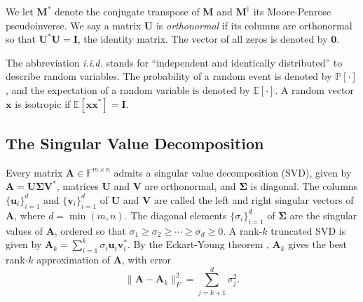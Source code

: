 \documentclass[11pt]{article}
\newcommand{\kpnote}[1]{\textit{\textcolor{violet}{KP: #1}}}
\newcommand{\llnote}[1]{\textit{\textcolor{olive}{LL: #1}}}
\newcommand{\F}{\mathbb{F}}
\begin{document}
We let $\mathbf{M}^*$ denote the conjugate transpose of $\mathbf{M}$ and $\mathbf{M}^\dagger$ its Moore-Penrose pseudoinverse.
We say a matrix $\mathbf{U}$ is \textit{orthonormal} if its columns are orthonormal so that $\mathbf{U}^* \mathbf{U} = \mathbf{I}$, the identity matrix.
The vector of all zeros is denoted by $\mathbf{0}$.

The abbreviation \textit{i.i.d.} stands for ``independent and identically distributed'' to describe random variables.
The probability of a random event is denoted by $\mathbb{P}[\cdot]$, and the expectation of a random variable is denoted by $\mathbb{E}[\cdot]$.
A random vector $\mathbf{x}$ is isotropic if $\mathbb{E}[\mathbf{x} \mathbf{x}^*
    ] = {\mathbf{I}}$.

\vspace{2mm}

\subsection{The Singular Value Decomposition}
\label{sec:svd}

Every matrix $\mathbf{A} \in \F^{m \times n}$ admits a {singular value decomposition} (SVD), given by $\mathbf{A} = \mathbf{U} \boldsymbol{\Sigma} \mathbf{V}^*$, matrices $\mathbf{U}$ and $\mathbf{V}$ are orthonormal, and $\boldsymbol{\Sigma}$ is diagonal.
The columns $\{ \mathbf{u}_i \}_{i=1}^{d}$ and $\{\mathbf{v}_{i}\}_{i=1}^{d}$ of $\mathbf{U}$ and $\mathbf{V}$ are called the left and right singular vectors of $\mathbf{A}$, where $d = \min(m,n)$.
The diagonal elements $\{ \sigma_i\}_{i=1}^{d}$ of $\boldsymbol{\Sigma}$ are the singular values of $\mathbf{A}$, ordered so that $\sigma_1 \geq \sigma_2 \geq \cdots \geq \sigma_d \geq 0$.
A rank-$k$ truncated SVD is given by $\mathbf{A}_k = \sum_{i=1}^k \sigma_i \mathbf{u}_i \mathbf{v}_i^*$.
By the Eckart-Young theorem \cite{eckart1936}, $\mathbf{A}_k$ gives the best rank-$k$ approximation of $\mathbf{A}$, with error
$$\| \mathbf{A} - \mathbf{A}_k\|_F^2 = \sum_{j = k+1}^{d} \sigma_j^2 .$$

\end{document}

